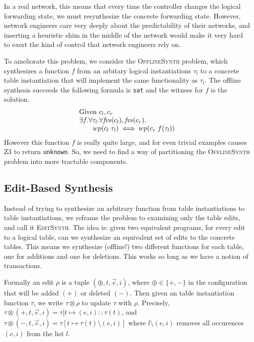 In a real network, this means that every time the
controller changes the logical forwarding state, we must resynthesize the
concrete forwarding state. However, network engineers care very deeply about the
predictability of their networks, and inserting a heuristic shim in the middle
of the network would make it very hard to exert the kind of control that network
engineers rely on.

To ameliorate this problem, we consider the \textsc{OfflineSynth} problem, which
synthesizes a function $f$ from an arbitary logical instantiations $\tau_l$ to a
concrete table instantiation that will implement the same functionality as
$\tau_l$. The offline synthesis succeeds the following formula is \texttt{sat}
and the witness for $f$ is the solution.
\[\begin{array}{l}
    \text{Given } c_l,c_r\\
    \exists f. \forall \tau_l. \forall \mathit{fvs}(c_l), \mathit{fvs}(c_r). \\
    \qquad wp(c_l\; \tau_l) \iff wp(c_r\; f(\tau_l))
  \end{array}\]
However this function $f$ is really quite large, and for even trivial
examples causes Z3 to return \texttt{unknown}. So, we need to find a way of
partitioning the \textsc{OfflineSynth} problem into more tractable
components.

\subsection{Edit-Based Synthesis}

Instead of trying to synthesize an arbitrary function from table instantiations
to table instantiations, we reframe the problem to examining only the table
edits, and call it \textsc{EditSynth}. The idea is: given two equivalent
programs, for every edit to a logical table, can we synthesize an equivalent set
of edits to the concrete tables. This means we synthesize (offline!) two
different functions for each table, one for additions and one for
deletions. This works so long as we have a notion of transactions.


Formally an edit $\rho$ is a tuple $(\oplus,t,\vec e,i)$, where
$\oplus \in \{+,-\}$ in the configuration that will be added $(+)$ or deleted
$(-)$. Then given an table instantiation function $\tau$, we write
$\tau \otimes \rho$ to update $\tau$ with $\rho$. Precisely,
$\tau \otimes (+,t,\vec e, i) = \tau[t \mapsto (e,i)::\tau(t)$, and
$\tau \otimes (-, t, \vec e, i) = \tau[t \mapsto \tau(t) \setminus (e,i)]$ where
$l \setminus (e,i)$ removes all occurences $(e,i)$ from the list $l$.


